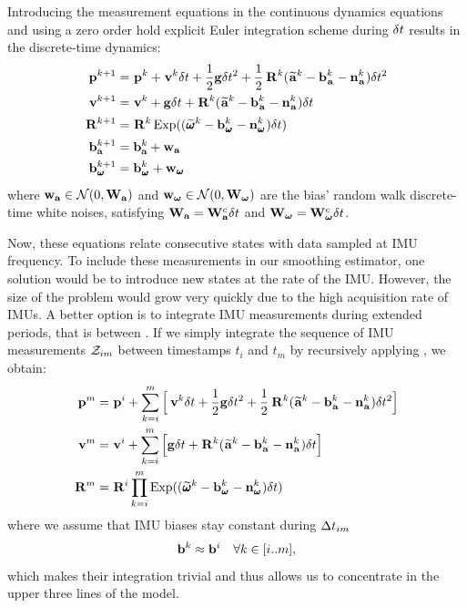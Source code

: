 Introducing the measurement equations  in the continuous dynamics equations  and using a zero order hold
explicit Euler integration scheme during $\delta t$ results in the discrete-time dynamics:
%
\begin{equation}
    \begin{split}
    \prescript{}{}{{\bf p}}_{}^{k+1} &= \prescript{}{}{{\bf p}}_{}^{k} + \prescript{}{}{{\bf v}}_{}^{k}\delta t + \frac{1}{2}{\bf g} \delta t^2 
    + \frac{1}{2}\prescript{}{}{{\bf R}}_{}^{k}(\prescript{}{}{\widetilde{{\bf a}}}_{}^k - {\bf b}_{\prescript{}{}{{\bf a}}_{}}^k - {\bf n}_{\prescript{}{}{{\bf a}}_{}}^k)\delta t^2 \\
    \prescript{}{}{{\bf v}}_{}^{k+1}  &= \prescript{}{}{{\bf v}}_{}^{k} + {\bf g} \delta t + \prescript{}{}{{\bf R}}_{}^{k}(\prescript{}{}{\widetilde{{\bf a}}}_{}^k - {\bf b}_{\prescript{}{}{{\bf a}}_{}}^k - {\bf n}_{\prescript{}{}{{\bf a}}_{}}^k)\delta t
    \\
    \prescript{}{}{{\bf R}}_{}^{k+1}  &= \prescript{}{}{{\bf R}}_{}^{k}\operatorname*{Exp}((\prescript{}{}{\widetilde{\pmb{\omega}}}_{}^k - {\bf b}_{\prescript{}{}{\pmb{\omega}}_{}}^k - {\bf n}_{\prescript{}{}{\pmb{\omega}}_{}}^k)\delta t)
    \\
    {\bf b}_{\bf a}^{k+1} &= {\bf b}_{\bf a}^k + {\bf w}_{\bf a}\\
    {\bf b}_{\prescript{}{}{\pmb{\omega}}_{}}^{k+1} &= {\bf b}_{\prescript{}{}{\pmb{\omega}}_{}}^k + {\bf w}_{\prescript{}{}{\pmb{\omega}}_{}}
    \end{split}
    \label{eq:imu_dyn_disc}
\end{equation}
%
where ${\bf w}_{{\bf a}} \in \mathcal{N}(0,{\bf W}_{\bf a})$ and ${\bf w}_{{{\bm \omega}}} \in \mathcal{N}(0,{\bf W}_{{\bm \omega}})$ are the bias' random walk discrete-time white noises, 
satisfying ${\bf W}_{\bf a}={\bf W}_{\bf a}^c \delta t$ and ${\bf W}_{{\bm \omega}}={\bf W}_{{\bm \omega}}^c\delta t$.

    
Now, these equations relate consecutive states with data sampled at IMU frequency. To include these measurements in our smoothing estimator,
one solution would be to introduce new states at the rate of the IMU. However, the size of the problem would grow very quickly due to the high acquisition rate of IMUs. 
A better option is to integrate IMU measurements during extended periods, that is between \keyframes. 
If we simply integrate the sequence of IMU measurements $\mathcal{Z}_{im}$ between timestamps 
$t_i$ and $t_m$ by recursively applying , we obtain:
%
\begin{equation}
    \begin{split}
    \prescript{}{}{{\bf p}}_{}^{m} &= \prescript{}{}{{\bf p}}_{}^{i} + \sum_{k=i}^{m} \Big[\prescript{}{}{{\bf v}}_{}^{k}\delta t + \frac{1}{2}{\bf g} \delta t^2 
    + \frac{1}{2}\prescript{}{}{{\bf R}}_{}^{k}(\prescript{}{}{\widetilde{{\bf a}}}_{}^k - {\bf b}_{\prescript{}{}{{\bf a}}_{}}^k - {\bf n}_{\prescript{}{}{{\bf a}}_{}}^k)\delta t^2 \Big] \\
    \prescript{}{}{{\bf v}}_{}^{m}  &= \prescript{}{}{{\bf v}}_{}^{i} + \sum_{k=i}^{m} \Big[{\bf g} \delta t + \prescript{}{}{{\bf R}}_{}^{k}(\prescript{}{}{\widetilde{{\bf a}}}_{}^k - {\bf b}_{\prescript{}{}{{\bf a}}_{}}^k - {\bf n}_{\prescript{}{}{{\bf a}}_{}}^k)\delta t \Big]  \\
    \prescript{}{}{{\bf R}}_{}^{m}  &= \prescript{}{}{{\bf R}}_{}^{i} \prod_{k=i}^{m} \operatorname*{Exp}((\prescript{}{}{\widetilde{\pmb{\omega}}}_{}^k - {\bf b}_{\prescript{}{}{\pmb{\omega}}_{}}^k - {\bf n}_{\prescript{}{}{\pmb{\omega}}_{}}^k)\delta t) 
    \end{split}
    \label{eq:imu_int_world}
\end{equation}
%
where we assume that IMU biases stay constant during $\Delta t_{im}$
\begin{equation*}
    {\bf b}^k \approx {\bf b}^i  ~~~ \forall k \in [i..m],
\end{equation*}
%
which makes their integration trivial and thus allows us to concentrate in the upper three lines of the model.




